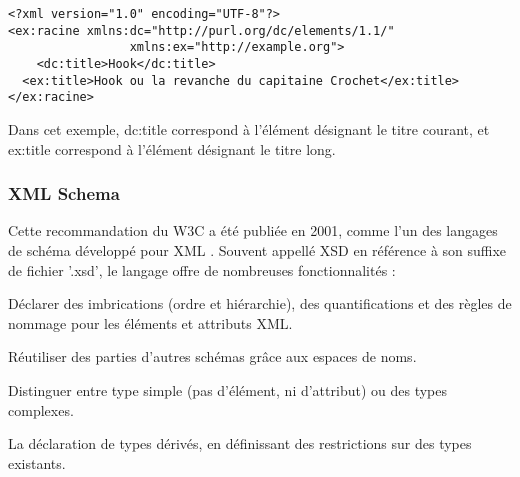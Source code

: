 
\begin{Verbatim}[fontsize=\small,formatcom=\color{black!70}]
<?xml version="1.0" encoding="UTF-8"?>
<ex:racine xmlns:dc="http://purl.org/dc/elements/1.1/"
    			 xmlns:ex="http://example.org">
	<dc:title>Hook</dc:title>
  <ex:title>Hook ou la revanche du capitaine Crochet</ex:title>
</ex:racine>
\end{Verbatim}
Dans cet exemple, dc:title correspond à l'élément désignant le titre courant, et ex:title correspond à l'élément désignant le titre long.


\subsubsection*{XML Schema}
Cette recommandation du W3C a été publiée en 2001, comme l'un des langages de schéma développé pour XML .
Souvent appellé XSD en référence à son suffixe de fichier '.xsd', le langage offre de nombreuses fonctionnalités : 
\begin{liste}
  \item Déclarer des imbrications (ordre et hiérarchie), des quantifications et des règles de nommage pour les éléments et attributs XML.
  \item Réutiliser des parties d'autres schémas grâce aux espaces de noms.
  \item Distinguer entre type simple (pas d'élément, ni d'attribut) ou des types complexes.
  \item La déclaration de types dérivés, en définissant des restrictions sur des types existants.
\end{liste}



